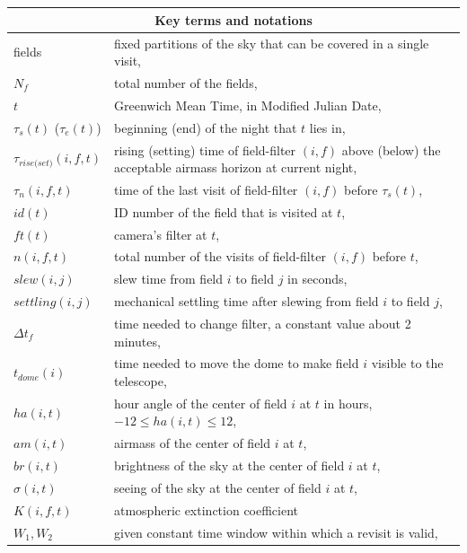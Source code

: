 \documentclass[12pt]{aastex62}
\theoremstyle{definition}
\begin{document}
\section*{}
\begin{table}[h]
\begin{tabular}{l  l }
\multicolumn{2}{c}{\textbf{Key terms and notations}}\\ \hline
fields & fixed partitions of the sky that can be covered in a single visit, \\
$N_{f}$ & total number of the fields,\\
$t$& Greenwich Mean Time, in Modified Julian Date,\\ 
$\tau_s(t)$ ($\tau_e(t)$)& beginning (end) of the night that $t$ lies in,\\
$\tau_{rise\text{(}set\text{)}}(i,f,t)$ & rising (setting) time of field-filter $(i,f)$ above (below) the acceptable airmass horizon at current night,\\
$\tau_n(i,f,t)$& time of the last visit of field-filter $(i,f)$ before $\tau_s(t)$,\\
$id(t)$ & ID number of the field that is visited at $t$,\\
$ft(t)$& camera's filter at $t$,\\
$n(i,f,t)$ & total number of the visits of field-filter $(i,f)$ before $t$,\\
$slew(i,j)$& slew time from field $i$ to field $j$ in seconds,\\
$settling(i,j)$& mechanical settling time after slewing from field $i$ to field $j$,\\
$\Delta t_{f}$& time needed to change filter, a constant value about 2 minutes,\\
$t_{dome}(i)$& time needed to move the dome to make field $i$ visible to the telescope,\\
$ha(i,t)$ & hour angle of the center of field $i$ at $t$ in hours, $-12 \leq ha(i,t) \leq 12$,\\
$am(i,t)$ & airmass of the center of field $i$ at $t$,\\
$br(i,t)$ & brightness of the sky at the center of field $i$ at $t$,\\
$\sigma(i,t)$ & seeing of the sky at the center of field $i$ at $t$,\\
$K(i,f, t)$ & atmospheric extinction coefficient\\
$W_1, W_2$ & given constant time window within which a revisit is valid, \\
\hline
\end{tabular}
\end{table}
\newpage
\end{document}
